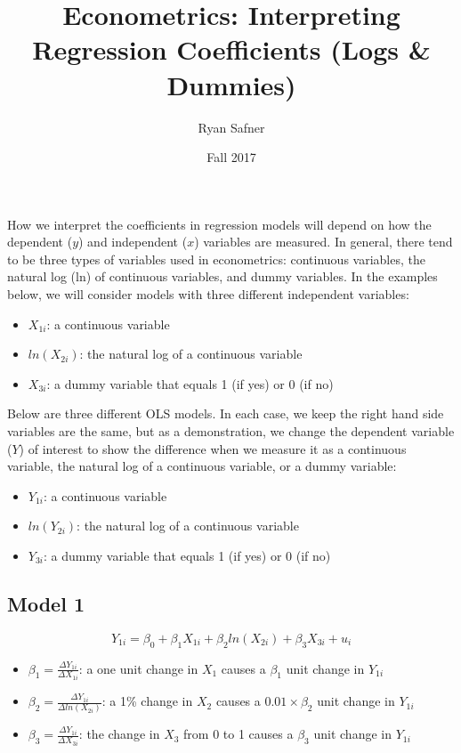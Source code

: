 \documentclass[12pt]{article}
\title{Econometrics: Interpreting Regression Coefficients (Logs \& Dummies)}
\author{Ryan Safner}
\date{Fall 2017}
\begin{document}
	\maketitle
	
How we interpret the coefficients in regression models will depend on how the dependent ($y$) and independent ($x$) variables are measured. In general, there tend to be three types of variables used in econometrics: continuous variables, the natural log (ln) of continuous variables, and dummy variables. In the examples below, we will consider models with three different independent variables:
\begin{itemize}
	\item $X_{1i}$: a continuous variable
	\item $ln(X_{2i})$: the natural log of a continuous variable
	\item $X_{3i}$: a dummy variable that equals 1 (if yes) or 0 (if no)
\end{itemize}

Below are three different OLS models. In each case, we keep the right hand side variables are the same, but as a demonstration, we change the dependent variable ($Y$) of interest to show the difference when we measure it as a continuous variable, the natural log of a continuous variable, or a dummy variable: 
\begin{itemize}
	\item $Y_{1i}$: a continuous variable
	\item $ln(Y_{2i})$: the natural log of a continuous variable
	\item $Y_{3i}$: a dummy variable that equals 1 (if yes) or 0 (if no)
\end{itemize}

\subsection*{Model 1}
\begin{equation}
	Y_{1i}=\beta_0+\beta_1X_{1i}+\beta_2ln(X_{2i})+\beta_3X_{3i}+u_i	
\end{equation}
\begin{itemize}
	\item $\beta_1=\frac{\Delta Y_{1i}}{\Delta X_{1i}}$: a one unit change in $X_1$ causes a $\beta_1$ unit change in $Y_{1i}$	
	\item $\beta_2=\frac{\Delta Y_{1i}}{\Delta ln(X_{2i})}$: a 1\% change in $X_2$ causes a $0.01\times\beta_2$ unit change in $Y_{1i}$	
	\item $\beta_3=\frac{\Delta Y_{1i}}{\Delta X_{3i}}$: the change in $X_3$ from 0 to 1 causes a $\beta_3$ unit change in $Y_{1i}$	
\end{itemize}
\end{document}
